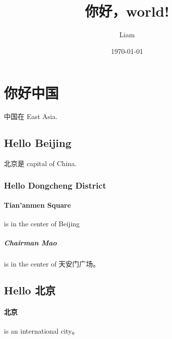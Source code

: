\documentclass[UTF8]{ctexart}
\title{你好，world!}
\author{Liam}
\date{\today}
\begin{document}
	\maketitle
	\section{你好中国}
	中国在 East Asia.
	\subsection{Hello Beijing}
	北京是 capital of China.
	\subsubsection{Hello Dongcheng District}
	\paragraph{Tian'anmen Square}
	is in the center of Beijing
	\subparagraph{Chairman Mao}
	is in the center of 天安门广场。
	\subsection{Hello 北京}
	\paragraph{北京} is an international city。
\end{document}
